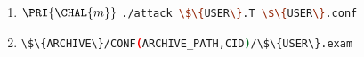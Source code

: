 

\begin{enumerate}
\item \DESCTASKIMPL
      {$\PRI{\CHAL{m}}$}
      {\mbox{\lstinline[language={bash}]|./attack \$\{USER\}.T \$\{USER\}.conf|}}
\item \DESCTASKEXAM
      {\mbox{\lstinline[language={bash}]|\$\{ARCHIVE\}/CONF(ARCHIVE_PATH,CID)/\$\{USER\}.exam|}}
\end{enumerate}

